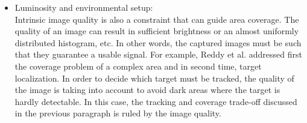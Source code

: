 \begin{itemize}
\item  Luminosity and environmental setup:\\ Intrinsic image quality is also a constraint that can guide area coverage. The quality of an image can result in sufficient brightness or an almost uniformly distributed histogram, etc. In other words, the captured images must be such that they guarantee a usable signal. For example, Reddy et al. \cite{33*reddy2012} addressed first the coverage problem of a complex area and in second time,  target localization. In order to decide which target must be tracked, the quality of the image is taking into account to avoid dark areas where the target is hardly detectable. In this case, the tracking and coverage trade-off discussed in the previous paragraph is  ruled by the image quality. \\


\end{itemize}
